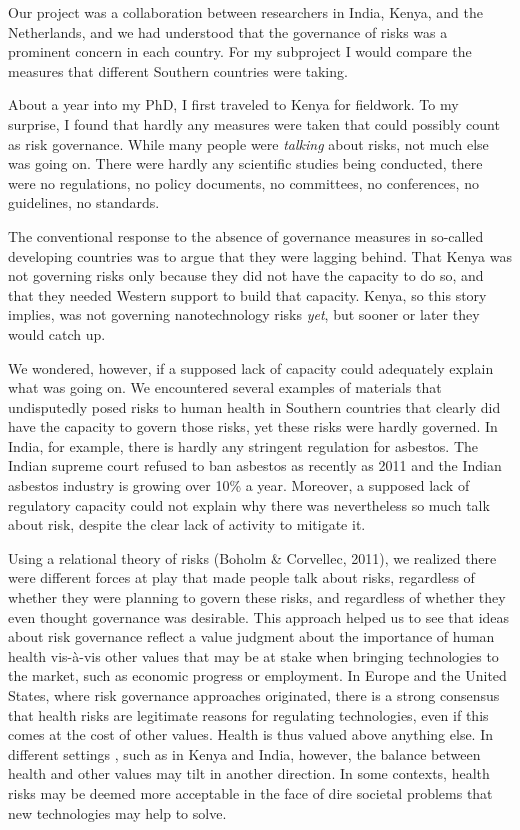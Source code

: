 \documentclass[authordate, anecdote]{jote-new-article}
\begin{document}
	Our project was a collaboration between researchers in India, Kenya, and the Netherlands, and we had understood that the governance of risks was a prominent concern in each country. For my subproject I would compare the measures that different Southern countries were taking.



	About a year into my PhD, I first traveled to Kenya for fieldwork. To my surprise, I found that hardly any measures were taken that could possibly count as risk governance. While many people were \emph{talking }about risks, not much else was going on. There were hardly any scientific studies being conducted, there were no regulations, no policy documents, no committees, no conferences, no guidelines, no standards.



	The conventional response to the absence of governance measures in so-called developing countries was to argue that they were lagging behind. That Kenya was not governing risks only because they did not have the capacity to do so, and that they needed Western support to build that capacity. Kenya, so this story implies, was not governing nanotechnology risks \emph{yet}, but sooner or later they would catch up.



	We wondered, however, if a supposed lack of capacity could adequately explain what was going on. We encountered several examples of materials that undisputedly posed risks to human health in Southern countries that clearly did have the capacity to govern those risks, yet these risks were hardly governed. In India, for example, there is hardly any stringent regulation for asbestos. The Indian supreme court refused to ban asbestos as recently as 2011 and the Indian asbestos industry is growing over 10\% a year. Moreover, a supposed lack of regulatory capacity could not explain why there was nevertheless so much talk about risk, despite the clear lack of activity to mitigate it.



	Using a relational theory of risks (Boholm \& Corvellec, 2011), we realized there were different forces at play that made people talk about risks, regardless of whether they were planning to govern these risks, and regardless of whether they even thought governance was desirable. This approach helped us to see that ideas about risk governance reflect a value judgment about the importance of human health vis-à-vis other values that may be at stake when bringing technologies to the market, such as economic progress or employment. In Europe and the United States, where risk governance approaches originated, there is a strong consensus that health risks are legitimate reasons for regulating technologies, even if this comes at the cost of other values. Health is thus valued above anything else. In different settings , such as in Kenya and India, however, the balance between health and other values may tilt in another direction. In some contexts, health risks may be deemed more acceptable in the face of dire societal problems that new technologies may help to solve.
\end{document}
